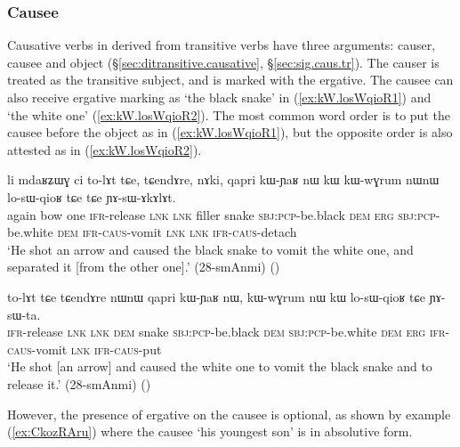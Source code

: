 \subsubsection{Causee} \label{sec:causee.kW}
Causative verbs in  derived from transitive verbs have three arguments: causer, causee and object (§\ref{sec:ditransitive.causative}, §\ref{sec:sig.caus.tr}). The causer is treated as the transitive subject, and is marked with the ergative. The causee can also receive  ergative marking as  `the black snake' in (\ref{ex:kW.losWqioR1}) and  `the white one' (\ref{ex:kW.losWqioR2}). The most common word order is to put the causee before the object as in (\ref{ex:kW.losWqioR1}), but the opposite order is also attested as in (\ref{ex:kW.losWqioR2}).

\begin{exe}
\ex \label{ex:kW.losWqioR1}
 \gll   li mdaʁʑɯɣ ci to-lɤt tɕe, tɕendɤre, nɤki, qapri kɯ-ɲaʁ nɯ kɯ kɯ-wɣrum nɯnɯ lo-sɯ-qioʁ tɕe tɕe ɲɤ-sɯ-ɤkɤlɤt. \\
 again bow one \textsc{ifr}-release \textsc{lnk} \textsc{lnk} filler snake \textsc{sbj}:\textsc{pcp}-be.black \textsc{dem} \textsc{erg} \textsc{sbj}:\textsc{pcp}-be.white \textsc{dem} \textsc{ifr}-\textsc{caus}-vomit \textsc{lnk} \textsc{lnk} \textsc{ifr}-\textsc{caus}-detach \\
 \glt `He shot an arrow and caused the black snake to vomit the white one, and separated it [from the other one].' (28-smAnmi) ()
\end{exe}

\begin{exe}
\ex \label{ex:kW.losWqioR2}
 \gll  to-lɤt tɕe tɕendɤre nɯnɯ qapri kɯ-ɲaʁ nɯ, kɯ-wɣrum nɯ kɯ lo-sɯ-qioʁ tɕe ɲɤ-sɯ-ta. \\
  \textsc{ifr}-release \textsc{lnk} \textsc{lnk} \textsc{dem} snake \textsc{sbj}:\textsc{pcp}-be.black \textsc{dem}  \textsc{sbj}:\textsc{pcp}-be.white \textsc{dem} \textsc{erg} \textsc{ifr}-\textsc{caus}-vomit \textsc{lnk} \textsc{ifr}-\textsc{caus}-put \\
  \glt `He shot [an arrow] and caused the white one to vomit the black snake and to release it.' (28-smAnmi)
()
\end{exe}

However, the presence of ergative on the causee is optional, as shown by example (\ref{ex:CkozRAru}) where the causee  `his youngest son' is in absolutive form.

